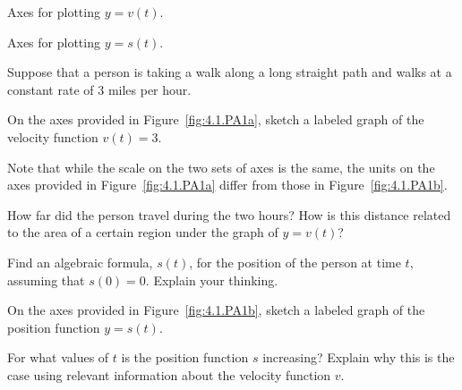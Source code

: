 \begin{marginfigure}
\caption{Axes for plotting $y = v(t)$.} \label{fig:4.1.PA1a}
\end{marginfigure}

\begin{marginfigure}[.25in]
\caption{Axes for plotting $y = s(t)$.} \label{fig:4.1.PA1b}
\end{marginfigure}

\begin{pa} \label{PA:4.1}
Suppose that a person is taking a walk along a long straight path and walks at a constant rate of 3 miles per hour.
\ba
\item On the axes provided in Figure~\ref{fig:4.1.PA1a}, sketch a labeled graph of the velocity function $v(t) = 3$.  

Note that while the scale on the two sets of axes is the same, the units on the axes provided in Figure~\ref{fig:4.1.PA1a} differ from those in Figure~\ref{fig:4.1.PA1b}.

\item How far did the person travel during the two hours?  How is this distance related to the area of a certain region under the graph of $y = v(t)$?

\item Find an algebraic formula, $s(t)$, for the position of the person at time $t$, assuming that $s(0) = 0$.  Explain your thinking.

\item On the axes provided in Figure~\ref{fig:4.1.PA1b}, sketch a labeled graph of the position function $y = s(t)$.

\item For what values of $t$ is the position function $s$ increasing?  Explain why this is the case using relevant information about the velocity function $v$.
\ea
\end{pa} 
\afterpa